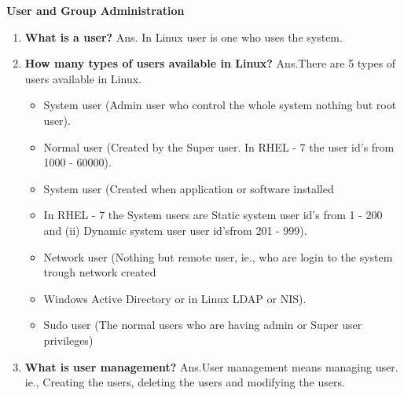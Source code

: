 \textbf{User and Group Administration}

\begin{enumerate}
    \item \textbf {What is a user?}
    \newline
    Ans. In Linux user is one who uses the system. 

	\bigskip
	\bigskip
    
    \item \textbf {How many types of users available in Linux?}
    \newline
    Ans.There are 5 types of users available in Linux.
    \begin{itemize}
	    \item System user   (Admin user who control the whole system nothing but root user).
	    \item Normal user  (Created by the Super user. In RHEL - 7 the user id's from 1000 - 60000).
	    \item System user   (Created when application or software installed 
	    \item In RHEL - 7 the System users are
	    Static system user id's from 1 - 200 and
	    (ii) Dynamic system user user id'sfrom 201 - 999).
	    \item Network user   (Nothing but remote user, ie., who are login to the system trough network  created
	    \item Windows Active Directory or in Linux LDAP or NIS). 
	    \item Sudo user   (The normal users who are having admin or Super user privileges)
    \end{itemize}

    
    \bigskip
    \bigskip
    
    \item \textbf { What is user management?}
    \newline
    Ans.User management means managing user. ie., Creating the users, deleting the users and modifying the users.
    
    \bigskip
    \bigskip
    

\end{enumerate}
